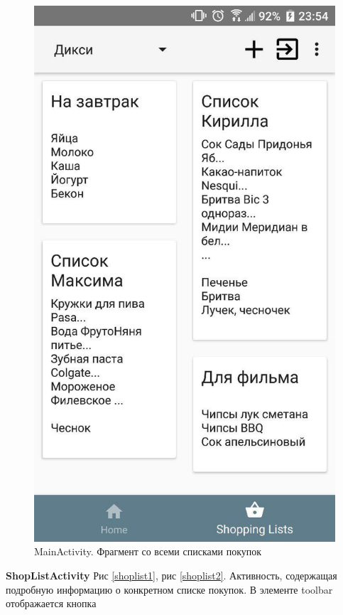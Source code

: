 \begin{my_enumerate}
\begin{figure}[h!]
            \includegraphics[height=0.42\textheight]{./screenshots/3/all_shoplists.jpg}
            \caption{\small{MainActivity. Фрагмент со всеми списками покупок}}
            \label{shoplist_fragment}
            \endminipage
        \end{figure}
    \item \textbf{ShopListActivity} Рис \ref{shoplist1}, рис \ref{shoplist2}. Активность, содержащая подробную информацию
        о конкретном списке покупок. В элементе toolbar отображается кнопка

\end{my_enumerate}
